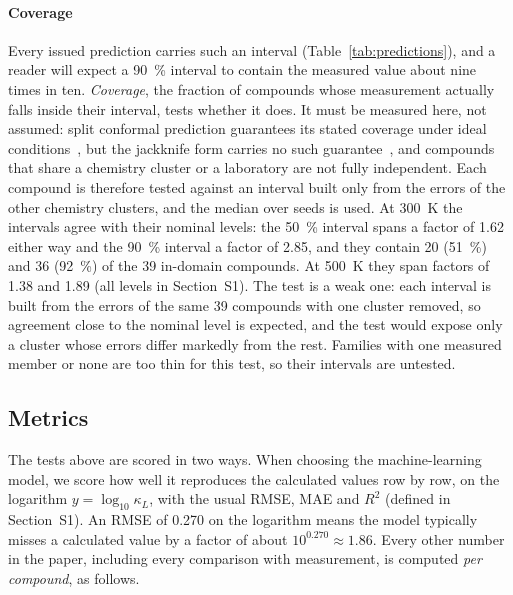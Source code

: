 \paragraph{Coverage} Every issued prediction carries such an interval (Table~\ref{tab:predictions}),
and a reader will expect a \SI{90}{\percent} interval to contain the measured value about nine times
in ten. \emph{Coverage}, the fraction of compounds whose measurement actually falls inside their
interval, tests whether it does. It must be measured here, not assumed: split conformal prediction
guarantees its stated coverage under ideal conditions~\cite{lei2018distributi}, but the jackknife
form carries no such guarantee~\cite{barber2021predictive}, and compounds that share a chemistry
cluster or a laboratory are not fully independent. Each compound is therefore tested against an
interval built only from the errors of the other chemistry clusters, and the median over seeds is
used. At \SI{300}{\kelvin} the intervals agree with their nominal levels: the \SI{50}{\percent} interval spans a factor of
\num{1.62} either way and the \SI{90}{\percent} interval a factor of \num{2.85}, and they contain
\num{20} (\SI{51}{\percent}) and \num{36} (\SI{92}{\percent}) of the \num{39} in-domain compounds.
At \SI{500}{\kelvin} they span factors of \num{1.38} and \num{1.89} (all levels in Section~S1).
The test is a weak one: each interval is built from the errors of the same \num{39} compounds with
one cluster removed, so agreement close to the nominal level is expected, and the test would expose
only a cluster whose errors differ markedly from the rest.
Families with one measured member or none are too thin for this test, so their intervals are
untested.

\subsection{Metrics}
\label{sec:metrics}
\label{sec:definitions}

The tests above are scored in two ways. When choosing the machine-learning model, we score how well it
reproduces the calculated values row by row, on the logarithm $y=\log_{10}\kappa_L$, with the usual
RMSE, MAE and $R^2$ (defined in Section~S1). An RMSE of \num{0.270} on the logarithm means the model
typically misses a calculated value by a factor of about $10^{0.270}\approx\num{1.86}$. Every other
number in the paper, including every comparison with measurement, is computed \emph{per compound},
as follows.

